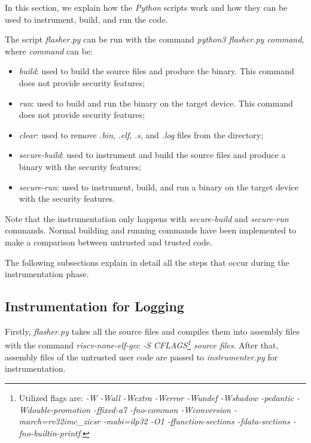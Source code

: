 In this section, we explain how the \textit{Python} scripts work and how they
can be used to instrument, build, and run the code.

The script \textit{flasher.py} can be run with the command \textit{python3
flasher.py command}, where \textit{command} can be:
\begin{itemize}[noitemsep]
  \item \textit{build}: used to build the source files and produce the binary.
    This command does not provide security features;

  \item \textit{run}: used to build and run the binary on the target device.
    This command does not provide security features;

  \item \textit{clear}: used to remove \textit{.bin}, \textit{.elf}, \textit{.s},
    and \textit{.log} files from the directory;

  \item \textit{secure-build}: used to instrument and build the source files and
    produce a binary with the security features;

  \item \textit{secure-run}: used to instrument, build, and run a binary on the target
    device with the security features.
\end{itemize}

Note that the instrumentation only happens with \textit{secure-build} and \textit{secure-run}
commands. Normal building and running commands have been implemented to make a comparison
between untrusted and trusted code.

The following subsections explain in detail all the steps that occur during the instrumentation
phase.

\subsection{Instrumentation for Logging}
\label{subsec:logging}

Firstly, \textit{flasher.py} takes all the source files and compiles them into
assembly files with the command \textit{riscv-none-elf-gcc -S CFLAGS\footnote{Utilized
flags are: \textit{-W -Wall -Wextra -Werror -Wundef -Wshadow -pedantic -Wdouble-promotion
-ffixed-a7 -fno-common -Wconversion -march=rv32imc\_zicsr -mabi=ilp32 -O1 -ffunction-sections
-fdata-sections -fno-builtin-printf}.} source files}. After that, assembly files
of the untrusted user code are passed to \textit{instrumenter.py} for
instrumentation.

